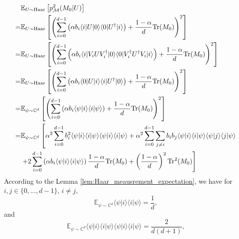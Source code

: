     \begin{equation} \label{eq2:p_M0}
        \begin{aligned}
            &\mathbb{E}_{U \sim \mathrm{Haar}}\left[ p^2_{\mathcal{M}}(M_0| U)\right] \\
            = & \mathbb{E}_{U \sim \mathrm{Haar}}\left[\left(\sum_{i=0}^{d-1} \left(\alpha b_i  \langle i |U | 0 \rangle \langle 0 | U^\dagger|i \rangle\right) + \frac{1-\alpha}{d}\mathrm{Tr}(M_0)\right)^2\right] \\
            = & \mathbb{E}_{U \sim \mathrm{Haar}}\left[\left(\sum_{i=0}^{d-1} \left(\alpha b_i  \langle i | V_i U V_i^\dagger | 0 \rangle \langle 0 | V_i^\dagger U^\dagger V_i|i \rangle\right) + \frac{1-\alpha}{d}\mathrm{Tr}(M_0)\right)^2\right] \\
            = & \mathbb{E}_{U \sim \mathrm{Haar}}\left[\left(\sum_{i=0}^{d-1} \left(\alpha b_i  \langle 0 |U | i \rangle \langle i | U^\dagger|0 \rangle\right) + \frac{1-\alpha}{d}\mathrm{Tr}(M_0)\right)^2\right] \\
            = & \mathbb{E}_{\psi \sim \mathbb{C}^d} \left[\left(\sum_{i=0}^{d-1} \left(\alpha b_i  \langle \psi | i \rangle \langle i |\psi \rangle\right) + \frac{1-\alpha}{d}\mathrm{Tr}(M_0)\right)^2\right] \\
            = & \mathbb{E}_{\psi \sim \mathbb{C}^d} \left[  \alpha^2 \sum_{i=0}^{d-1} b^2_i  \langle \psi | i \rangle \langle i |\psi \rangle\langle \psi | i \rangle \langle i |\psi \rangle + \alpha^2\sum_{i=0}^{d-1}\sum_{j \neq i}b_ib_j \langle \psi | i \rangle \langle i |\psi \rangle\langle \psi | j \rangle \langle j |\psi \rangle \right.\\
            &\left. + 2\sum_{i=0}^{d-1} \left(\alpha b_i  \langle \psi | i \rangle \langle i |\psi \rangle\right)\frac{1-\alpha}{d}\mathrm{Tr}(M_0) + \left(\frac{1-\alpha}{d}\right)^2\mathrm{Tr}^2(M_0)    \right] \\
        \end{aligned}
    \end{equation}
    According to the Lemma \ref{lem:Haar_meausrement_expectation}, we have for $i,j \in \{0,...,d-1\}$, $i\neq j$,
    \begin{equation} \label{eq:expectation_i}
        \mathbb{E}_{\psi \sim \mathbb{C}^d} \langle \psi | i \rangle \langle i |\psi \rangle= \frac{1}{d},
    \end{equation}
    and
    \begin{equation} \label{eq:expectation_ii}
        \mathbb{E}_{\psi \sim \mathbb{C}^d} \langle \psi | i \rangle \langle i |\psi \rangle\langle \psi | i \rangle \langle i |\psi \rangle= \frac{2}{d(d+1)},
    \end{equation}
